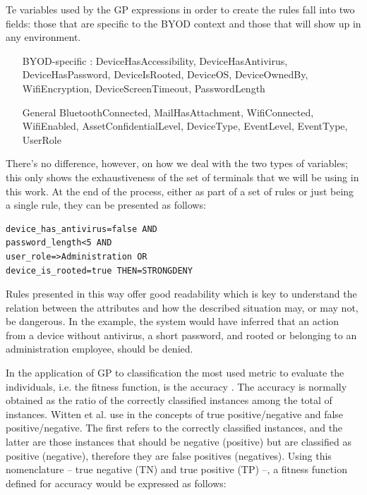 \documentclass[runningheads]{llncs}
\begin{document}
Te variables used by the GP expressions in order to create the rules fall
into two fields: those that are specific to the BYOD context and those
that will show up in any environment.\begin{itemize}
  \item[BYOD-specific]: DeviceHasAccessibility, DeviceHasAntivirus,
    DeviceHasPassword, DeviceIsRooted, DeviceOS, DeviceOwnedBy,
    WifiEncryption, DeviceScreenTimeout, PasswordLength
  \item[General] BluetoothConnected, MailHasAttachment, WifiConnected, WifiEnabled,
    AssetConfidentialLevel, DeviceType, EventLevel, EventType, UserRole
  \end{itemize}

  There's no difference, however, on how we deal with the two types of
  variables; this only shows the exhaustiveness of the set of terminals
  that we will be using in this work. At the end of the process, either as part of a set of rules or just being a single rule, they can be presented as follows:

\begin{verbatim}
device_has_antivirus=false AND
password_length<5 AND
user_role=>Administration OR
device_is_rooted=true THEN=STRONGDENY
\end{verbatim}

Rules presented in this way offer good readability which is key to understand the relation between the attributes and how the described situation may, or may not, be dangerous. In the example, the system would have inferred that an action from a device without antivirus, a short password, and rooted or belonging to an administration employee, should be denied.

\label{subsec:chossingfitness}

In the application of GP to classification
the most used metric to evaluate the individuals, i.e. the fitness function, is the accuracy
\cite{espejo2010survey}. The accuracy is normally obtained as the
ratio of the correctly classified instances among the total of
instances. Witten et al. use in \cite{witten2005data} the
concepts of true positive/negative and false positive/negative. The
first refers to the correctly classified instances, and the latter are
those instances that should be negative (positive) but are classified
as positive (negative), therefore they are false positives
(negatives). Using this nomenclature -- true negative (TN) and true positive (TP) --, a fitness function defined for
accuracy would be expressed as follows: 
\end{document}
